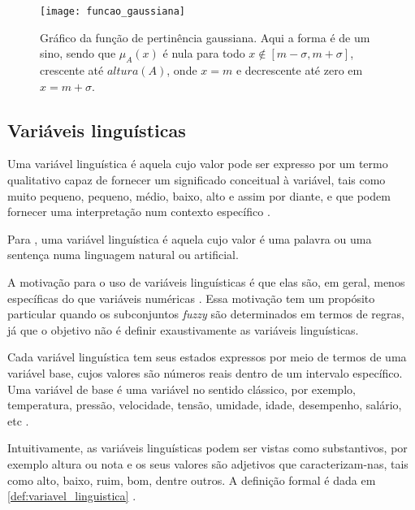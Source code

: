 \begin{figure}[!h]
  \centering
  \texttt{[image: funcao\_gaussiana]}
  \caption[Gráfico da função de pertinência gaussiana]{Gráfico da função de pertinência gaussiana. Aqui a forma é de um sino, sendo que $\mu_A(x)$ é nula para todo $x \notin [m - \sigma, m + \sigma]$, crescente  até $altura(A)$, onde $x = m$ e decrescente até zero em $x = m + \sigma$.}
  \label{fig:funcao_fuzzy_gaussiana}
\end{figure}


\subsection{Variáveis linguísticas}
\label{sec:variaveis_linguisticas}
Uma variável linguística é aquela cujo valor pode ser expresso por um termo qualitativo capaz de fornecer um significado conceitual à variável, tais como muito pequeno, pequeno, médio, baixo, alto e assim por diante, e que podem fornecer uma interpretação num contexto específico \citep{pedrycz:98}.

Para \citet{zadeh:75}, uma variável linguística é aquela cujo valor é uma palavra ou uma sentença numa linguagem natural ou artificial.

A motivação para o uso de variáveis linguísticas é que elas são, em geral, menos específicas do que variáveis numéricas \citep{zadeh:75}. Essa motivação tem um propósito particular quando os subconjuntos \emph{fuzzy} são determinados em termos de regras, já que o objetivo não é definir exaustivamente as variáveis linguísticas.

Cada variável linguística tem seus estados expressos por meio de termos de uma variável base, cujos valores são números reais dentro de um intervalo específico. Uma variável de base é uma variável no sentido clássico, por exemplo, temperatura, pressão, velocidade, tensão, umidade, idade, desempenho, salário, etc \citep{klir:95}.

Intuitivamente, as variáveis linguísticas  podem ser vistas como substantivos, por exemplo altura ou nota e os seus valores são adjetivos que caracterizam-nas, tais como alto, baixo, ruim, bom, dentre outros. A definição formal é dada em \ref{def:variavel_linguistica} \citep{zadeh:75, klir:95}.

